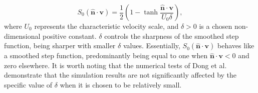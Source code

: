 \documentclass{article}
\numberwithin{equation}{section}
\begin{document}
\begin{equation}
S_0(\boldsymbol{\hat{n}} \cdot \boldsymbol{v})=\frac{1}{2}\left(1-\tanh \frac{\boldsymbol{\hat{n}} \cdot \boldsymbol{v}}{U_0 \delta}\right),
\end{equation}
where $U_0$ represents the characteristic velocity scale, and $\delta>0$ is a chosen non-dimensional positive constant. $\delta$ controls the sharpness of the smoothed step function, being sharper with smaller $\delta$ values. Essentially, $S_0(\boldsymbol{\hat{n}} \cdot \boldsymbol{v})$ behaves like a smoothed step function, predominantly being equal to one when $\boldsymbol{\hat{n}} \cdot \boldsymbol{v}<0$ and zero elsewhere. It is worth noting that the numerical tests of Dong et al. demonstrate that the simulation results are not significantly affected by the specific value of $\delta$ when it is chosen to be relatively small. 
\end{document}
